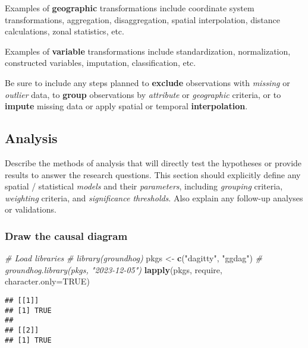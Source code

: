 \documentclass[
]{article}
\newenvironment{Shaded}{\begin{snugshade}}{\end{snugshade}}
\newcommand{\AttributeTok}[1]{\textcolor[rgb]{0.13,0.29,0.53}{#1}}
\newcommand{\CommentTok}[1]{\textcolor[rgb]{0.56,0.35,0.01}{\textit{#1}}}
\newcommand{\ConstantTok}[1]{\textcolor[rgb]{0.56,0.35,0.01}{#1}}
\newcommand{\FunctionTok}[1]{\textcolor[rgb]{0.13,0.29,0.53}{\textbf{#1}}}
\newcommand{\NormalTok}[1]{#1}
\newcommand{\OtherTok}[1]{\textcolor[rgb]{0.56,0.35,0.01}{#1}}
\newcommand{\StringTok}[1]{\textcolor[rgb]{0.31,0.60,0.02}{#1}}
\begin{document}
Examples of \textbf{geographic} transformations include coordinate
system transformations, aggregation, disaggregation, spatial
interpolation, distance calculations, zonal statistics, etc.

Examples of \textbf{variable} transformations include standardization,
normalization, constructed variables, imputation, classification, etc.

Be sure to include any steps planned to \textbf{exclude} observations
with \emph{missing} or \emph{outlier} data, to \textbf{group}
observations by \emph{attribute} or \emph{geographic} criteria, or to
\textbf{impute} missing data or apply spatial or temporal
\textbf{interpolation}.

\hypertarget{analysis}{%
\subsection{Analysis}\label{analysis}}

Describe the methods of analysis that will directly test the hypotheses
or provide results to answer the research questions. This section should
explicitly define any spatial / statistical \emph{models} and their
\emph{parameters}, including \emph{grouping} criteria, \emph{weighting}
criteria, and \emph{significance thresholds}. Also explain any follow-up
analyses or validations.

\hypertarget{draw-the-causal-diagram}{%
\subsubsection{Draw the causal diagram}\label{draw-the-causal-diagram}}

\begin{Shaded}
\begin{Highlighting}[]
\CommentTok{\# Load libraries}
\CommentTok{\# library(groundhog)}
\NormalTok{pkgs }\OtherTok{\textless{}{-}} \FunctionTok{c}\NormalTok{(}\StringTok{"dagitty"}\NormalTok{, }\StringTok{"ggdag"}\NormalTok{)}
\CommentTok{\# groundhog.library(pkgs, "2023{-}12{-}05")}
\FunctionTok{lapply}\NormalTok{(pkgs, require, }\AttributeTok{character.only=}\ConstantTok{TRUE}\NormalTok{)}
\end{Highlighting}
\end{Shaded}

\begin{verbatim}
## [[1]]
## [1] TRUE
## 
## [[2]]
## [1] TRUE
\end{verbatim}
\end{document}
